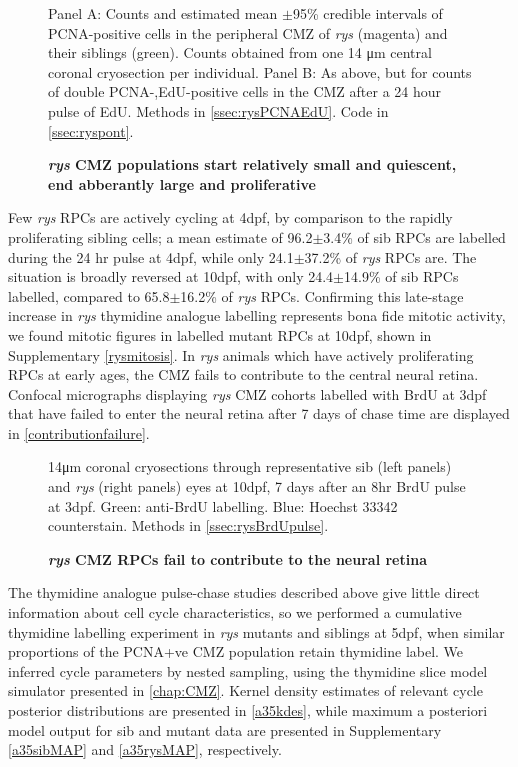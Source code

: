 \begin{figure}[!h]
    \caption{{\bf \textit{rys} CMZ populations start relatively small and quiescent, end abberantly large and proliferative}}
    Panel A: Counts and estimated mean $\pm$95\% credible intervals of PCNA-positive cells in the peripheral CMZ of \textit{rys} (magenta) and their siblings (green). Counts obtained from one 14 \si{\micro\metre} central coronal cryosection per individual.
    Panel B: As above, but for counts of double PCNA-,EdU-positive cells in the CMZ after a 24 hour pulse of EdU.
    \label{rysCMZontogeny}
    Methods in \autoref{ssec:rysPCNAEdU}.
    Code in \autoref{ssec:ryspont}.
\end{figure}
\FloatBarrier

Few \textit{rys} RPCs are actively cycling at 4dpf, by comparison to the rapidly proliferating sibling cells; a mean estimate of 96.2$\pm$3.4\% of sib RPCs are labelled during the 24 hr pulse at 4dpf, while only 24.1$\pm$37.2\% of \textit{rys} RPCs are. The situation is broadly reversed at 10dpf, with only 24.4$\pm$14.9\% of sib RPCs labelled, compared to 65.8$\pm$16.2\% of \textit{rys} RPCs. Confirming this late-stage increase in \textit{rys} thymidine analogue labelling represents bona fide mitotic activity, we found mitotic figures in labelled mutant RPCs at 10dpf, shown in Supplementary \autoref{rysmitosis}. In \textit{rys} animals which have actively proliferating RPCs at early ages, the CMZ fails to contribute to the central neural retina. Confocal micrographs displaying \textit{rys} CMZ cohorts labelled with BrdU at 3dpf that have failed to enter the neural retina after 7 days of chase time are displayed in \autoref{contributionfailure}. 

\begin{figure}[!h]
    \caption{{\bf \textit{rys} CMZ RPCs fail to contribute to the neural retina}}
    14\si{\micro\metre} coronal cryosections through representative sib (left panels) and \textit{rys} (right panels) eyes at 10dpf, 7 days after an 8hr BrdU pulse at 3dpf. Green: anti-BrdU labelling. Blue: Hoechst 33342 counterstain.
    Methods in \autoref{ssec:rysBrdUpulse}.
    \label{contributionfailure}
\end{figure}
\FloatBarrier

The thymidine analogue pulse-chase studies described above give little direct information about cell cycle characteristics, so we performed a cumulative thymidine labelling experiment in \textit{rys} mutants and siblings at 5dpf, when similar proportions of the PCNA+ve CMZ population retain thymidine label. We inferred cycle parameters by nested sampling, using the thymidine slice model simulator presented in \autoref{chap:CMZ}. Kernel density estimates of relevant cycle posterior distributions are presented in \autoref{a35kdes}, while maximum a posteriori model output for sib and mutant data are presented in Supplementary \autoref{a35sibMAP} and \autoref{a35rysMAP}, respectively. 

